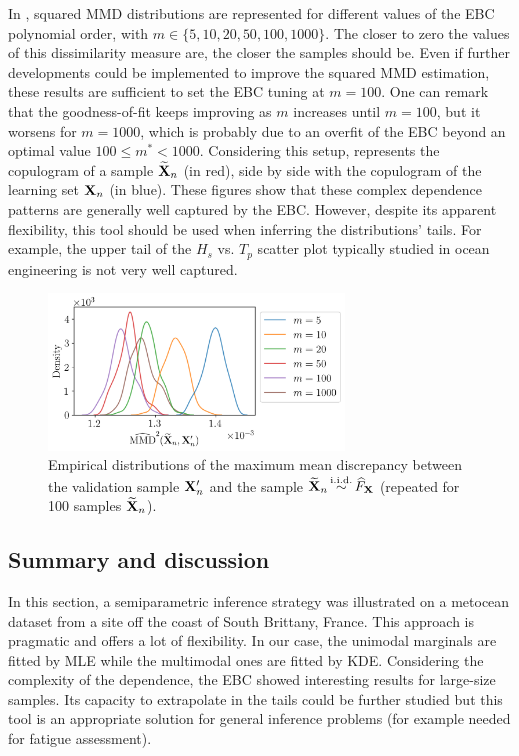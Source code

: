 In , squared MMD distributions are represented for different values of the EBC polynomial order, with $m\in\{5, 10, 20, 50, 100, 1000\}$. 
The closer to zero the values of this dissimilarity measure are, the closer the samples should be. 
Even if further developments could be implemented to improve the squared MMD estimation, these results are sufficient to set the EBC tuning at $m=100$. 
One can remark that the goodness-of-fit keeps improving as $m$ increases until $m=100$, but it worsens for $m=1000$, which is probably due to an overfit of the EBC beyond an optimal value $100 \leq m^* < 1000$. 
Considering this setup,  represents the copulogram of a sample $\widetilde{{\bf X}}_n$ (in red), side by side with the copulogram of the learning set ${\bf X}_n$ (in blue). 
These figures show that these complex dependence patterns are generally well captured by the EBC. 
However, despite its apparent flexibility, this tool should be used when inferring the distributions' tails. 
For example, the upper tail of the $H_s$ vs. $T_p$ scatter plot typically studied in ocean engineering is not very well captured.

\begin{figure}
    \centering
    \includegraphics[width=0.7\textwidth]{../numerical_experiments/chapter3/figures/SB_MMD_goodness.png}
    \caption{Empirical distributions of the maximum mean discrepancy between the validation sample ${\bf X}_n'$ and the sample $\widetilde{{\bf X}}_n \mathop{\sim}\limits^{\mathrm{i.i.d.}} \widehat{F}_{\bf X}$ (repeated for 100 samples $\widetilde{{\bf X}}_n$).}
    \label{fig:sb_ebc_mmd}
\end{figure}


\subsection{Summary and discussion}
In this section, a semiparametric inference strategy was illustrated on a metocean dataset from a site off the coast of South Brittany, France. 
This approach is pragmatic and offers a lot of flexibility. 
In our case, the unimodal marginals are fitted by MLE while the multimodal ones are fitted by KDE. 
Considering the complexity of the dependence, the EBC showed interesting results for large-size samples. 
Its capacity to extrapolate in the tails could be further studied \citep{heredia_2022_nonparam_copula} but this tool is an appropriate solution for general inference problems (for example needed for fatigue assessment). 

